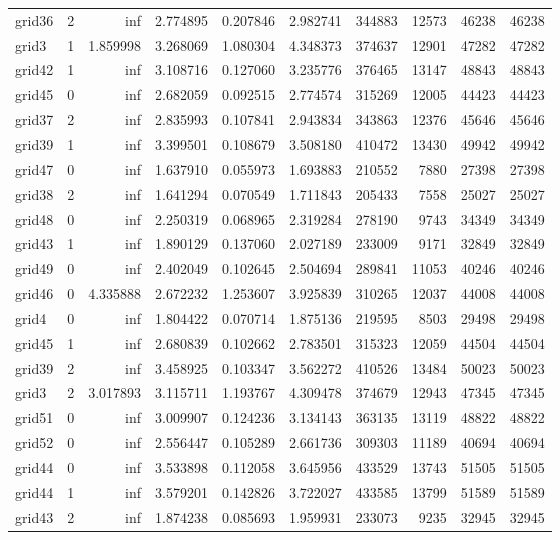 \documentclass[../../../thesis.tex]{subfiles}
\begin{document}
\begin{longtable}{|l|r|r|r|r|r|r|r|r|r|}
grid36 & 2 & inf & 2.774895 & 0.207846 & 2.982741 & 344883 & 12573 & 46238 & 46238 \\
grid3 & 1 & 1.859998 & 3.268069 & 1.080304 & 4.348373 & 374637 & 12901 & 47282 & 47282 \\
grid42 & 1 & inf & 3.108716 & 0.127060 & 3.235776 & 376465 & 13147 & 48843 & 48843 \\
grid45 & 0 & inf & 2.682059 & 0.092515 & 2.774574 & 315269 & 12005 & 44423 & 44423 \\
grid37 & 2 & inf & 2.835993 & 0.107841 & 2.943834 & 343863 & 12376 & 45646 & 45646 \\
grid39 & 1 & inf & 3.399501 & 0.108679 & 3.508180 & 410472 & 13430 & 49942 & 49942 \\
grid47 & 0 & inf & 1.637910 & 0.055973 & 1.693883 & 210552 & 7880 & 27398 & 27398 \\
grid38 & 2 & inf & 1.641294 & 0.070549 & 1.711843 & 205433 & 7558 & 25027 & 25027 \\
grid48 & 0 & inf & 2.250319 & 0.068965 & 2.319284 & 278190 & 9743 & 34349 & 34349 \\
grid43 & 1 & inf & 1.890129 & 0.137060 & 2.027189 & 233009 & 9171 & 32849 & 32849 \\
grid49 & 0 & inf & 2.402049 & 0.102645 & 2.504694 & 289841 & 11053 & 40246 & 40246 \\
grid46 & 0 & 4.335888 & 2.672232 & 1.253607 & 3.925839 & 310265 & 12037 & 44008 & 44008 \\
grid4 & 0 & inf & 1.804422 & 0.070714 & 1.875136 & 219595 & 8503 & 29498 & 29498 \\
grid45 & 1 & inf & 2.680839 & 0.102662 & 2.783501 & 315323 & 12059 & 44504 & 44504 \\
grid39 & 2 & inf & 3.458925 & 0.103347 & 3.562272 & 410526 & 13484 & 50023 & 50023 \\
grid3 & 2 & 3.017893 & 3.115711 & 1.193767 & 4.309478 & 374679 & 12943 & 47345 & 47345 \\
grid51 & 0 & inf & 3.009907 & 0.124236 & 3.134143 & 363135 & 13119 & 48822 & 48822 \\
grid52 & 0 & inf & 2.556447 & 0.105289 & 2.661736 & 309303 & 11189 & 40694 & 40694 \\
grid44 & 0 & inf & 3.533898 & 0.112058 & 3.645956 & 433529 & 13743 & 51505 & 51505 \\
grid44 & 1 & inf & 3.579201 & 0.142826 & 3.722027 & 433585 & 13799 & 51589 & 51589 \\
grid43 & 2 & inf & 1.874238 & 0.085693 & 1.959931 & 233073 & 9235 & 32945 & 32945 \\

\end{longtable}
\end{document}
